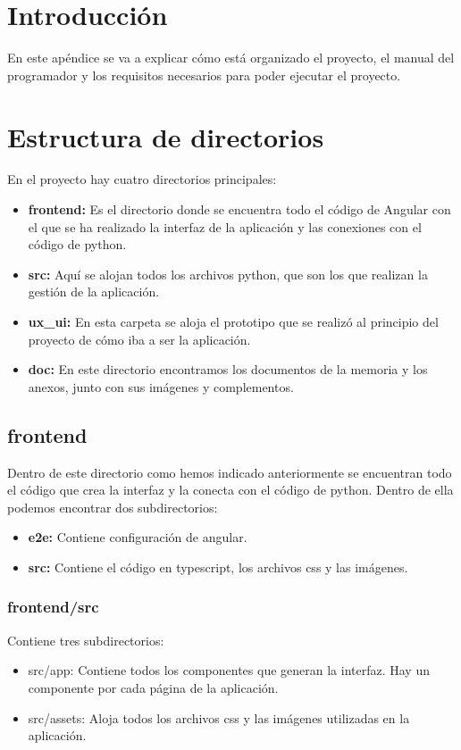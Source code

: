 
\section{Introducción}
En este apéndice se va a explicar cómo está organizado el proyecto, el manual del programador y los requisitos necesarios para poder ejecutar el proyecto. 

\section{Estructura de directorios}
En el proyecto hay cuatro directorios principales:
\begin{itemize}
\tightlist
    \item\textbf{frontend:} Es el directorio donde se encuentra todo el código de Angular con el que se ha realizado la interfaz de la aplicación y las conexiones con el código de python.
    \item\textbf{src:} Aquí se alojan todos los archivos python, que son los que realizan la gestión de la aplicación.
    \item\textbf{ux\_ui:} En esta carpeta se aloja el prototipo que se realizó al principio del proyecto de cómo iba a ser la aplicación.
    \item\textbf{doc:} En este directorio encontramos los documentos de la memoria y los anexos, junto con sus imágenes y complementos.
\end{itemize}
\newpage
\subsection{frontend}
Dentro de este directorio como hemos indicado anteriormente se encuentran todo el código que crea la interfaz y la conecta con el código de python.
Dentro de ella podemos encontrar dos subdirectorios:
\begin{itemize}
\tightlist
    \item\textbf{e2e:} Contiene configuración de angular.
    \item\textbf{src:} Contiene el código en typescript, los archivos css y las imágenes.
\end{itemize}

\subsubsection{frontend/src}
Contiene tres subdirectorios:
\begin{itemize}
\tightlist
    \item src/app: Contiene todos los componentes que generan la interfaz. Hay un componente por cada página de la aplicación.
    \item src/assets: Aloja todos los archivos css y las imágenes utilizadas en la aplicación.
\end{itemize}


